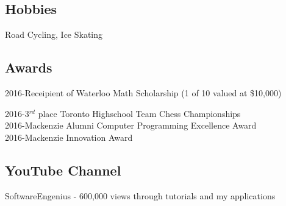 \documentclass[]{deedy-resume-openfont}
\begin{document}
\begin{minipage}[t]{0.33\textwidth}
\subsection{Hobbies}
Road Cycling, Ice Skating\\

\vspace{2mm}

\subsection{Awards}


2016-Receipient of Waterloo Math Scholarship (1 of 10 valued at \$10,000) \\
\vspace{1mm}

2016-3$^{rd}$ place Toronto Highschool Team Chess Championships \\
\vspace{1mm}
2016-Mackenzie Alumni Computer Programming Excellence Award \\
\vspace{1mm}
2016-Mackenzie Innovation Award\\

\vspace{2mm}


\subsection{YouTube Channel}
SoftwareEngenius - 600,000 views through tutorials and my applications
\sectionsep
\vspace{2mm}



\end{minipage}
\end{document}
